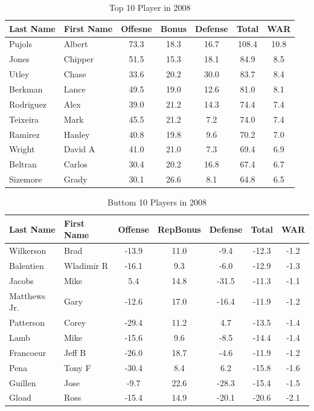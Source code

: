 \begin{table}[htbp]
  \caption{Top 10 Player in 2008}
  \label{tab:top} 
  \centering
  \begin{tabular}{|l|l|c|c|c|c|c|}
     \hline
     \textbf{Last Name} & \textbf{First Name} & \textbf{Offesne} & \textbf{Bonus} & \textbf{Defense} & \textbf{Total} & \textbf{WAR}\\
     \hline
     Pujols & Albert & 73.3 & 18.3 & 16.7 & 108.4 & 10.8\\
     Jones & Chipper & 51.5 & 15.3 & 18.1 & 84.9 & 8.5\\
     Utley & Chase & 33.6 & 20.2 & 30.0 & 83.7 & 8.4\\
     Berkman & Lance & 49.5 & 19.0 & 12.6 & 81.0 & 8.1\\
     Rodriguez & Alex & 39.0 & 21.2 & 14.3 & 74.4 & 7.4\\
     Teixeira & Mark & 45.5 & 21.2 & 7.2 & 74.0 & 7.4\\
     Ramirez & Hanley & 40.8 & 19.8 & 9.6 & 70.2 & 7.0\\
     Wright & David A & 41.0 & 21.0 & 7.3 & 69.4 & 6.9\\
     Beltran & Carlos & 30.4 & 20.2 & 16.8 & 67.4 & 6.7\\
     Sizemore & Grady & 30.1 & 26.6 & 8.1 & 64.8 & 6.5\\
    \hline
  \end{tabular}
\end{table}


\begin{table}[htbp]
  \caption{Buttom 10 Players in 2008}
  \label{tab:buttom} 
  \centering
  \begin{tabular}{|l|l|c|c|c|c|c|}
     \hline
     \textbf{Last Name} & \textbf{First Name} & \textbf{Offense} & \textbf{RepBonus} & \textbf{Defense} & \textbf{Total} & \textbf{WAR}\\
     \hline
     Wilkerson & Brad & -13.9 & 11.0 & -9.4 & -12.3 & -1.2\\
     Balentien & Wladimir R & -16.1 & 9.3 & -6.0 & -12.9 & -1.3\\
     Jacobs & Mike & 5.4 & 14.8 & -31.5 & -11.3 & -1.1\\
     Matthews Jr. & Gary & -12.6 & 17.0 & -16.4 & -11.9 & -1.2\\
     Patterson & Corey & -29.4 & 11.2 & 4.7 & -13.5 & -1.4\\
     Lamb & Mike & -15.6 & 9.6 & -8.5 & -14.4 & -1.4\\
     Francoeur & Jeff B & -26.0 & 18.7 & -4.6 & -11.9 & -1.2\\
     Pena & Tony F & -30.4 & 8.4 & 6.2 & -15.8 & -1.6\\
     Guillen & Jose & -9.7 & 22.6 & -28.3 & -15.4 & -1.5\\
     Gload & Ross & -15.4 & 14.9 & -20.1 & -20.6 & -2.1\\
    \hline
  \end{tabular}
\end{table}


